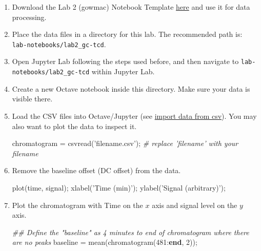 \documentclass[]{tufte-book}
\newenvironment{Shaded}{}{}
\newcommand{\CommentTok}[1]{\textcolor[rgb]{0.38,0.63,0.69}{\textit{#1}}}
\newcommand{\ControlFlowTok}[1]{\textcolor[rgb]{0.00,0.44,0.13}{\textbf{#1}}}
\newcommand{\FloatTok}[1]{\textcolor[rgb]{0.25,0.63,0.44}{#1}}
\newcommand{\FunctionTok}[1]{\textcolor[rgb]{0.02,0.16,0.49}{#1}}
\newcommand{\NormalTok}[1]{#1}
\newcommand{\OperatorTok}[1]{\textcolor[rgb]{0.40,0.40,0.40}{#1}}
\newcommand{\StringTok}[1]{\textcolor[rgb]{0.25,0.44,0.63}{#1}}
\begin{document}
\begin{enumerate}
\def\labelenumi{\arabic{enumi}.}
\item
  Download the Lab 2 (gowmac) Notebook Template \href{/devel/chem370/notebooks}{here} and use it for data processing.
\item
  Place the data files in a directory for this lab. The recommended path is: \texttt{lab-notebooks/lab2\_gc-tcd}.
\item
  Open Jupyter Lab following the steps used before, and then navigate to \texttt{lab-notebooks/lab2\_gc-tcd} within Jupyter Lab.
\item
  Create a new Octave notebook inside this directory. Make sure your data is visible there.
\item
  Load the CSV files into Octave/Jupyter (see \protect\hyperlink{import-data-from-csv}{import data from csv}). You may also want to plot the data to inspect it.

\begin{Shaded}
\begin{Highlighting}[]
\NormalTok{chromatogram }\OperatorTok{=} \FunctionTok{csvread}\NormalTok{(}\StringTok{'filename.csv'}\NormalTok{)}\OperatorTok{;}  \CommentTok{# replace 'filename' with your filename}
\end{Highlighting}
\end{Shaded}
\item
  Remove the baseline offset (DC offset) from the data.

\begin{Shaded}
\begin{Highlighting}[]
\FunctionTok{plot}\NormalTok{(}\FunctionTok{time}\OperatorTok{,}\NormalTok{ signal)}\OperatorTok{;}
\FunctionTok{xlabel}\NormalTok{(}\StringTok{'Time (min)'}\NormalTok{)}\OperatorTok{;}
\FunctionTok{ylabel}\NormalTok{(}\StringTok{'Signal (arbitrary)'}\NormalTok{)}\OperatorTok{;}
\end{Highlighting}
\end{Shaded}
\item
  Plot the chromatogram with Time on the \(x\) axis and signal level on the \(y\) axis.

\begin{Shaded}
\begin{Highlighting}[]
\CommentTok{## Define the "baseline" as 4 minutes to end of chromatogram where there are no peaks}
\NormalTok{baseline }\OperatorTok{=} \FunctionTok{mean}\NormalTok{(chromatogram(}\FloatTok{481}\OperatorTok{:}\ControlFlowTok{end}\OperatorTok{,} \FloatTok{2}\NormalTok{))}\OperatorTok{;}


\end{Highlighting}
\end{Shaded}
\end{enumerate}
\end{document}
